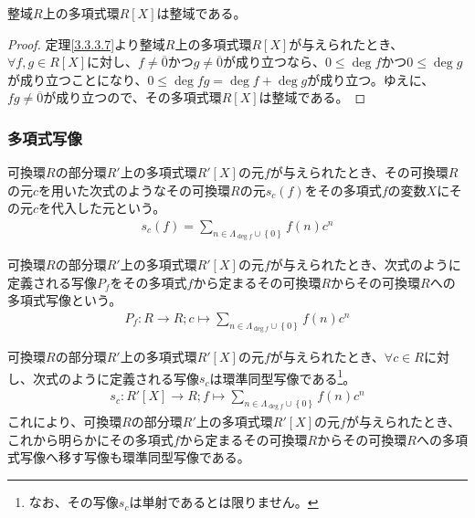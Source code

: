 \documentclass[dvipdfmx]{jsarticle}
\begin{document}
\begin{thm}\label{3.3.3.8} 整域$R$上の多項式環$R[ X]$は整域である。
\end{thm}
\begin{proof} 定理\ref{3.3.3.7}より整域$R$上の多項式環$R[ X]$が与えられたとき、$\forall f,g \in R[ X]$に対し、$f \neq \overline{0}$かつ$g \neq \overline{0}$が成り立つなら、$0 \leq \deg f$かつ$0 \leq \deg g$が成り立つことになり、$0 \leq \deg{fg} = \deg f + \deg g$が成り立つ。ゆえに、$fg \neq \overline{0}$が成り立つので、その多項式環$R[ X]$は整域である。
\end{proof}
\subsubsection{多項式写像}%
\begin{dfn}
可換環$R$の部分環$R'$上の多項式環$R'[ X]$の元$f$が与えられたとき、その可換環$R$の元$c$を用いた次式のようなその可換環$R$の元$s_{c}(f)$をその多項式$f$の変数$X$にその元$c$を代入した元という。
\begin{align*}
s_{c}(f) = \sum_{n \in \varLambda_{\deg f} \cup \left\{ 0 \right\}} {f(n)c^{n}}
\end{align*}
\end{dfn}
\begin{dfn}
可換環$R$の部分環$R'$上の多項式環$R'[ X]$の元$f$が与えられたとき、次式のように定義される写像$P_{f}$をその多項式$f$から定まるその可換環$R$からその可換環$R$への多項式写像という。
\begin{align*}
P_{f}:R \rightarrow R;c \mapsto \sum_{n \in \varLambda_{\deg f} \cup \left\{ 0 \right\}} {f(n)c^{n}}
\end{align*}
\end{dfn}
\begin{thm}\label{3.3.3.9}
可換環$R$の部分環$R'$上の多項式環$R'[ X]$の元$f$が与えられたとき、$\forall c \in R$に対し、次式のように定義される写像$s_{c}$は環準同型写像である\footnote{なお、その写像$s_{c}$は単射であるとは限りません。}。
\begin{align*}
s_{c}:R'[ X] \rightarrow R;f \mapsto \sum_{n \in \varLambda_{\deg f} \cup \left\{ 0 \right\}} {f(n)c^{n}}
\end{align*}
これにより、可換環$R$の部分環$R'$上の多項式環$R'[ X]$の元$f$が与えられたとき、これから明らかにその多項式$f$から定まるその可換環$R$からその可換環$R$への多項式写像へ移す写像も環準同型写像である。
\end{thm}
\end{document}
